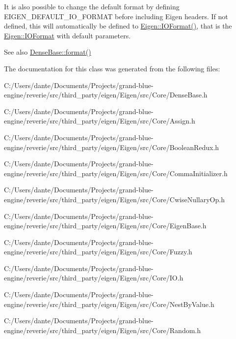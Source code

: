 It is also possible to change the default format by defining E\+I\+G\+E\+N\+\_\+\+D\+E\+F\+A\+U\+L\+T\+\_\+\+I\+O\+\_\+\+F\+O\+R\+M\+AT before including Eigen headers. If not defined, this will automatically be defined to \mbox{\hyperlink{struct_eigen_1_1_i_o_format}{Eigen\+::\+I\+O\+Format()}}, that is the \mbox{\hyperlink{struct_eigen_1_1_i_o_format}{Eigen\+::\+I\+O\+Format}} with default parameters.

\begin{DoxySeeAlso}{See also}
\mbox{\hyperlink{class_eigen_1_1_dense_base_ab231f1a6057f28d4244145e12c9fc0c7}{Dense\+Base\+::format()}} 
\end{DoxySeeAlso}


The documentation for this class was generated from the following files\+:\begin{DoxyCompactItemize}
\item 
C\+:/\+Users/dante/\+Documents/\+Projects/grand-\/blue-\/engine/reverie/src/third\+\_\+party/eigen/\+Eigen/src/\+Core/Dense\+Base.\+h\item 
C\+:/\+Users/dante/\+Documents/\+Projects/grand-\/blue-\/engine/reverie/src/third\+\_\+party/eigen/\+Eigen/src/\+Core/Assign.\+h\item 
C\+:/\+Users/dante/\+Documents/\+Projects/grand-\/blue-\/engine/reverie/src/third\+\_\+party/eigen/\+Eigen/src/\+Core/Boolean\+Redux.\+h\item 
C\+:/\+Users/dante/\+Documents/\+Projects/grand-\/blue-\/engine/reverie/src/third\+\_\+party/eigen/\+Eigen/src/\+Core/Comma\+Initializer.\+h\item 
C\+:/\+Users/dante/\+Documents/\+Projects/grand-\/blue-\/engine/reverie/src/third\+\_\+party/eigen/\+Eigen/src/\+Core/Cwise\+Nullary\+Op.\+h\item 
C\+:/\+Users/dante/\+Documents/\+Projects/grand-\/blue-\/engine/reverie/src/third\+\_\+party/eigen/\+Eigen/src/\+Core/Eigen\+Base.\+h\item 
C\+:/\+Users/dante/\+Documents/\+Projects/grand-\/blue-\/engine/reverie/src/third\+\_\+party/eigen/\+Eigen/src/\+Core/Fuzzy.\+h\item 
C\+:/\+Users/dante/\+Documents/\+Projects/grand-\/blue-\/engine/reverie/src/third\+\_\+party/eigen/\+Eigen/src/\+Core/I\+O.\+h\item 
C\+:/\+Users/dante/\+Documents/\+Projects/grand-\/blue-\/engine/reverie/src/third\+\_\+party/eigen/\+Eigen/src/\+Core/Nest\+By\+Value.\+h\item 
C\+:/\+Users/dante/\+Documents/\+Projects/grand-\/blue-\/engine/reverie/src/third\+\_\+party/eigen/\+Eigen/src/\+Core/Random.\+h\item 

\end{DoxyCompactItemize}
